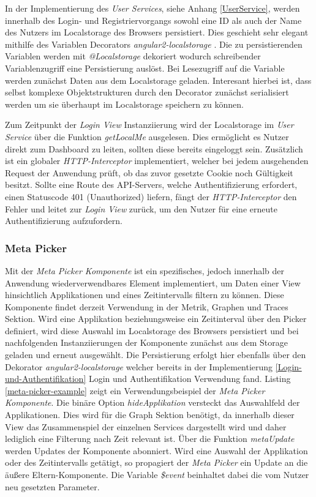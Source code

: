 In der Implementierung des \emph{User Services}, siehe Anhang \ref{UserService}, werden innerhalb des Login- und Registriervorgangs
sowohl eine ID als auch der Name des Nutzers im Localstorage des Browsers persistiert.
Dies geschieht sehr elegant mithilfe des Variablen Decorators \emph{angular2-localstorage} \cite{marcj95:online}.
Die zu persistierenden Variablen werden mit \emph{@Localstorage} dekoriert wodurch schreibender Variablenzugriff eine Persistierung auslöst.
Bei Lesezugriff auf die Variable werden zunächst Daten aus dem Localstorage geladen.
Interesant hierbei ist, dass selbst komplexe Objektstrukturen durch den Decorator zunächst serialisiert werden um sie überhaupt im Localstorage speichern zu können.

Zum Zeitpunkt der \emph{Login View} Instanziierung wird der Localstorage im \emph{User Service} über die Funktion \emph{getLocalMe} ausgelesen.
Dies ermöglicht es Nutzer direkt zum Dashboard zu leiten, sollten diese bereits eingeloggt sein.
Zusätzlich ist ein globaler \emph{HTTP-Interceptor} implementiert, welcher bei jedem ausgehenden Request der Anwendung prüft, ob das zuvor gesetzte Cookie noch Gültigkeit besitzt.
Sollte eine Route des \ac{API}-Servers, welche Authentifizierung erfordert, einen Statuscode 401 (Unauthorized) liefern,
fängt der \emph{HTTP-Interceptor} den Fehler und leitet zur \emph{Login View} zurück, um den Nutzer für eine erneute Authentifizierung aufzufordern.




\subsubsection{Meta Picker}

Mit der \emph{Meta Picker Komponente} ist ein spezifisches, jedoch innerhalb der Anwendung wiederverwendbares Element implementiert, um Daten einer View hinsichtlich Applikationen und eines Zeitintervalls filtern zu können.
Diese Komponente findet derzeit Verwendung in der Metrik, Graphen und Traces Sektion. Wird eine Applikation beziehungsweise ein Zeitinterval über den Picker definiert,
wird diese Auswahl im Localstorage des Browsers persistiert und bei nachfolgenden Instanziierungen der Komponente zunächst aus dem Storage geladen und erneut ausgewählt.
Die Persistierung erfolgt hier ebenfalls über den Dekorator \emph{angular2-localstorage}
welcher bereits in der Implementierung \ref{Login-und-Authentifikation} Login und Authentifikation Verwendung fand.
Listing \ref{meta-picker-example} zeigt ein Verwendungsbeispiel der \emph{Meta Picker Komponente}.
Die binäre Option \emph{hideApplikation} versteckt das Auswahlfeld der Applikationen. Dies wird für die Graph Sektion benötigt,
da innerhalb dieser View das Zusammenspiel der einzelnen Services dargestellt wird und daher lediglich eine Filterung nach Zeit relevant ist.
Über die Funktion \emph{metaUpdate} werden Updates der Komponente abonniert. Wird eine Auswahl der Applikation oder des Zeitintervalls getätigt,
so propagiert der \emph{Meta Picker} ein Update an die äußere Eltern-Komponente. Die Variable \emph{\$event} beinhaltet dabei die vom Nutzer neu gesetzten Parameter.


